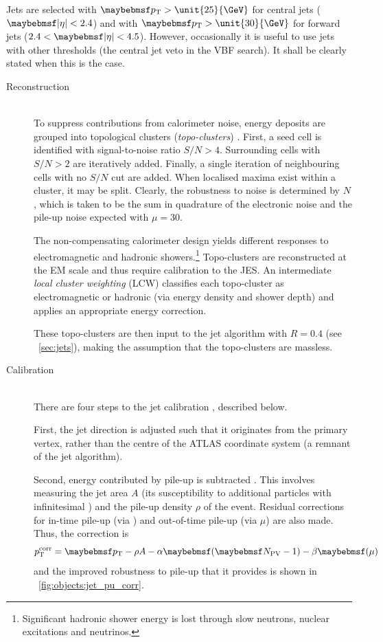 Jets are selected with $\pt > \unit{25}{\GeV}$ for central jets ($\mods{\eta} < 2.4$) and 
with $\pt > \unit{30}{\GeV}$ for forward jets ($2.4 < \mods{\eta} < 4.5$). However, 
occasionally it is useful to use jets with other \pt thresholds (\eg the central jet 
veto in the VBF search). It shall be clearly stated when this is the case.

\begin{description}
\item[Reconstruction] \hfill \\
	To suppress contributions from calorimeter noise, energy deposits are grouped into 
	topological clusters (\textit{topo-clusters}) \cite{Jets:Calib:2010,Jets:Calib:2011}. 
	First, a seed cell is identified with signal-to-noise ratio $S/N > 4$. Surrounding 
	cells with $S/N > 2$ are iteratively added. Finally, a single iteration of 
	neighbouring cells with no $S/N$ cut are added. When localised maxima exist within a 
	cluster, it may be split. Clearly, the robustness to noise is determined by $N$, 
	which is taken to be the sum in quadrature of the electronic noise and the pile-up 
	noise expected with $\mu = 30$.

	The non-compensating calorimeter design yields different responses to electromagnetic 
	and hadronic showers.\footnote{
		Significant hadronic shower energy is lost through slow neutrons, nuclear 
		excitations and neutrinos.
	}
	Topo-clusters are reconstructed at the EM scale and thus require calibration to the 
	\ac{JES}. An intermediate \textit{local cluster weighting} (LCW) classifies each
	topo-cluster as electromagnetic or hadronic (via energy density and shower depth) 
	and applies an appropriate energy correction.
	
	These topo-clusters are then input to the \antikt jet algorithm with $R = 0.4$ (see 
	\Section~\ref{sec:jets}), making the assumption that the topo-clusters are massless.

\item[Calibration] \hfill \\
	There are four steps to the jet calibration \cite{Jets:Calib:2011}, described below.

	First, the jet direction is adjusted such that it originates from the primary vertex, 
	rather than the centre of the ATLAS coordinate system (a remnant of the jet 
	algorithm).

	Second, energy contributed by pile-up is subtracted \cite{Jets:PileupCorrection:2012}.
	This involves measuring the jet area $A$ (its susceptibility to additional particles 
	with infinitesimal \pt) and the pile-up density $\rho$ of the event. Residual 
	corrections for in-time pile-up (via \npv) and out-of-time pile-up (via $\mu$) are 
	also made. Thus, the correction is
	\begin{equation}
		p_{\text{T}}^{\text{corr}} = \pt - \rho A - \alpha \parenths{\npv - 1} 
		- \beta \parenths{\mu}
	\end{equation}
	and the improved robustness to pile-up that it provides is shown in 
	\Figure~\ref{fig:objects:jet_pu_corr}.


\end{description}

